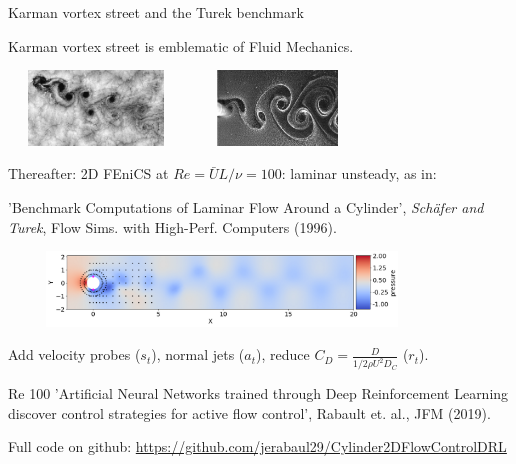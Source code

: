 \documentclass{beamer}
\begin{document}
\begin{frame}{Karman vortex street and the Turek benchmark}
    \begin{center}
        Karman vortex street is emblematic of Fluid Mechanics.
    \end{center}

     \begin{center}
      \includegraphics[width=0.35\textwidth, height=2cm]{./Figures/karman_in_Nature}
      \hspace{0.05cm}
      \includegraphics[width=0.35\textwidth, height=2cm]{./Figures/Karman_in_experiment}
    \end{center}

    Thereafter: 2D FEniCS at $Re = \bar{U} L / \nu = 100$: laminar unsteady, as in:

    \begin{center}
        'Benchmark Computations of Laminar Flow Around a Cylinder', \textit{Sch\"afer and Turek}, Flow Sims. with High-Perf. Computers (1996).
    \end{center}

    \begin{center}
      \includegraphics[width=0.85\textwidth, height=2cm]{./Figures/probe_position_pressure}
    \end{center}

    Add velocity probes ($s_t$), normal jets ($a_t$), reduce $C_D = \frac{D}{1/2 \rho U^2 D_C}$ ($r_t$).
\end{frame}


\begin{frame}{Re 100}
    'Artificial Neural Networks trained through Deep Reinforcement Learning discover control strategies for active flow control', Rabault et. al., JFM (2019). \\

    \begin{center}
\end{center}
    Full code on github: \url{https://github.com/jerabaul29/Cylinder2DFlowControlDRL}
\end{frame}
\end{document}

